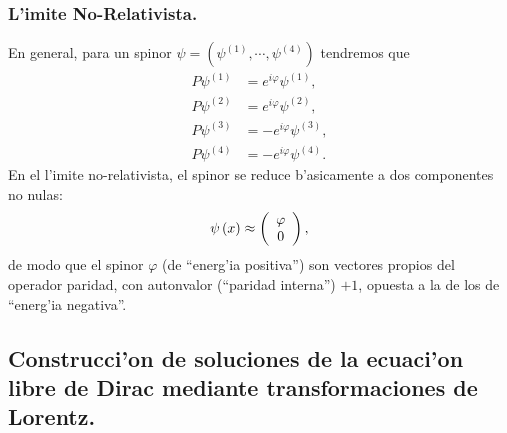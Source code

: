 \subsubsection{L'imite No-Relativista.}
En general, para un spinor $\psi=(\psi^{(1)},\cdots,\psi^{(4)})$ tendremos que
\begin{align}
\hat{P}\psi^{(1)} & =e^{i\varphi}\psi^{(1)},\\
\hat{P}\psi^{(2)} & =e^{i\varphi}\psi^{(2) },\\
\hat{P}\psi^{(3)} & =-e^{i\varphi}\psi^{(3) },\\
\hat{P}\psi^{(4)} & =-e^{i\varphi}\psi^{(4) }.%
\end{align}
En el l'imite no-relativista, el spinor se reduce b'asicamente a dos componentes
no nulas:
\begin{equation}
\psi\left( x\right) \approx\left(
\begin{array}
[c]{c}%
\varphi\\
0
\end{array}
\right),
\end{equation}
de modo que el spinor $\varphi$ (de ``energ'ia positiva'') son vectores propios
del operador paridad, con autonvalor (``paridad interna'') $+1$, opuesta a la de
los de ``energ'ia negativa''.


\subsection{Construcci'on de soluciones de la ecuaci'on libre de Dirac
mediante transformaciones de Lorentz.}

